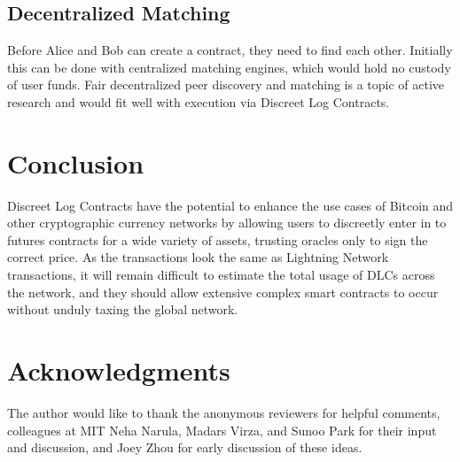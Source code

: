 \documentclass[10pt]{article}
\begin{document}
\subsection*{Decentralized Matching}

Before Alice and Bob can create a contract, they need to find each other.  Initially this can be done with centralized matching engines, which would hold no custody of user funds.  Fair decentralized peer discovery and matching is a topic of active research and would fit well with execution via Discreet Log Contracts.

\section*{Conclusion}

Discreet Log Contracts have the potential to enhance the use cases of Bitcoin and other cryptographic currency networks by allowing users to discreetly enter in to futures contracts for a wide variety of assets, trusting oracles only to sign the correct price.  As the transactions look the same as Lightning Network transactions, it will remain difficult to estimate the total usage of DLCs across the network, and they should allow extensive complex smart contracts to occur without unduly taxing the global network.

\section*{Acknowledgments}
The author would like to thank the anonymous reviewers for helpful comments, colleagues at MIT Neha Narula, Madars Virza, and Sunoo Park for their input and discussion, and Joey Zhou for early discussion of these ideas.


%



\end{document}
